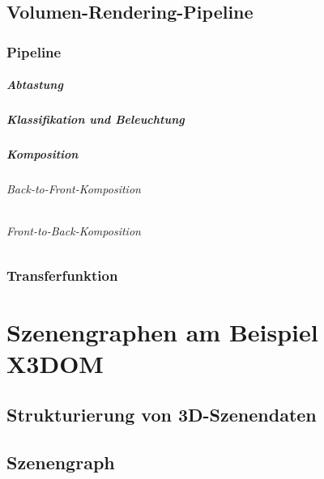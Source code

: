 \documentclass[a4paper, 11pt, accentcolor = tud3b]{tudreport}
\begin{document}
		\section{Volumen-Rendering-Pipeline} %

			\subsection{Pipeline} %

				\paragraph{Abtastung} %

				\paragraph{Klassifikation und Beleuchtung} %

				\paragraph{Komposition} %

					\subparagraph{Back-to-Front-Komposition} %

					\subparagraph{Front-to-Back-Komposition} %

			\subsection{Transferfunktion} %

	\chapter{Szenengraphen am Beispiel X3DOM} %

		\section{Strukturierung von 3D-Szenendaten} %

		\section{Szenengraph} %
\end{document}
